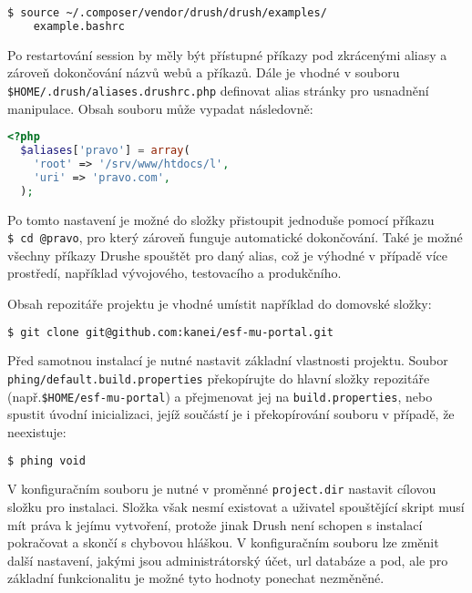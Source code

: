 \begin{lstlisting}[language=bash]
  $ source ~/.composer/vendor/drush/drush/examples/
    example.bashrc
\end{lstlisting} 

Po restartování \gls{session} by měly být přístupné příkazy pod zkrácenými aliasy a zároveň dokončování názvů webů a příkazů. Dále je vhodné v souboru \linebreak\texttt{\$HOME/.drush/aliases.drushrc.php} definovat alias stránky pro usnadnění manipulace. Obsah souboru může vypadat následovně:

\begin{lstlisting}[language=php]
  <?php
  $aliases['pravo'] = array(
    'root' => '/srv/www/htdocs/l',
    'uri' => 'pravo.com',
  );
\end{lstlisting}

Po tomto nastavení je možné do složky přistoupit jednoduše pomocí příkazu \texttt{\$~cd~@pravo}, pro který zároveň funguje automatické dokončování. Také je možné všechny příkazy Drushe spouštět pro daný alias, což je výhodné v případě více prostředí, například vývojového, testovacího a produkčního.

Obsah repozitáře projektu je vhodné umístit například do domovské složky:

\begin{lstlisting}[language=bash]
  $ git clone git@github.com:kanei/esf-mu-portal.git  
\end{lstlisting}

Před samotnou instalací je nutné nastavit základní vlastnosti projektu. Soubor \texttt{phing/default.build.properties} překopírujte do hlavní složky repozitáře (např.\texttt{\$HOME/esf-mu-portal}) a přejmenovat jej na \texttt{build.properties}, nebo spustit úvodní inicializaci, jejíž součástí je i překopírování souboru v případě, že neexistuje:

\begin{lstlisting}[language=bash]
  $ phing void
\end{lstlisting}

V konfiguračním souboru je nutné v proměnné \texttt{project.dir} nastavit cílovou složku pro instalaci. Složka však nesmí existovat a uživatel spouštějící skript musí mít práva k jejímu vytvoření, protože jinak Drush není schopen s instalací pokračovat a skončí s chybovou hláškou. V konfiguračním souboru lze změnit další nastavení, jakými jsou administrátorský účet, url databáze a pod, ale pro základní funkcionalitu je možné tyto hodnoty ponechat nezměněné.


